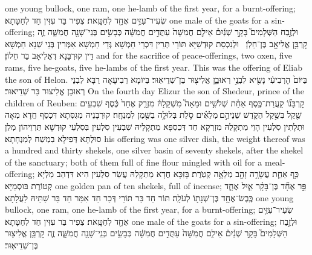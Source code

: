 {one young bullock, one ram, one he-lamb of the first year, for a burnt-offering;}{}
{שְׂעִיר־עִזִּ֥ים אֶחָ֖ד לְחַטָּֽאת׃}
{צְפִיר בַּר עִזִּין חַד לְחַטָּתָא׃}
{one male of the goats for a sin-offering;}{}
{וּלְזֶ֣בַח הַשְּׁלָמִים֮ בָּקָ֣ר שְׁנַ֒יִם֒ אֵילִ֤ם חֲמִשָּׁה֙ עַתֻּדִ֣ים חֲמִשָּׁ֔ה כְּבָשִׂ֥ים בְּנֵי־שָׁנָ֖ה חֲמִשָּׁ֑ה זֶ֛ה קׇרְבַּ֥ן אֱלִיאָ֖ב בֶּן־חֵלֹֽן׃ \petucha }
{וּלְנִכְסַת קוּדְשַׁיָּא תּוֹרֵי תְּרֵין דִּכְרֵי חַמְשָׁא גְּדֵי חַמְשָׁא אִמְּרִין בְּנֵי שְׁנָא חַמְשָׁא דֵּין קוּרְבָּנָא דֶּאֱלִיאָב בַּר חֵלוֹן׃}
{and for the sacrifice of peace-offerings, two oxen, five rams, five he-goats, five he-lambs of the first year. This was the offering of Eliab the son of Helon.}{}
{בַּיּוֹם֙ הָרְבִיעִ֔י נָשִׂ֖יא לִבְנֵ֣י רְאוּבֵ֑ן אֱלִיצ֖וּר בֶּן־שְׁדֵיאֽוּר׃}
{בְּיוֹמָא רְבִיעָאָה רַבָּא לִבְנֵי רְאוּבֵן אֱלִיצוּר בַּר שְׁדֵיאוּר׃}
{On the fourth day Elizur the son of Shedeur, prince of the children of Reuben:}{}
{קׇרְבָּנ֞וֹ קַֽעֲרַת־כֶּ֣סֶף אַחַ֗ת שְׁלֹשִׁ֣ים וּמֵאָה֮ מִשְׁקָלָהּ֒ מִזְרָ֤ק אֶחָד֙ כֶּ֔סֶף שִׁבְעִ֥ים שֶׁ֖קֶל בְּשֶׁ֣קֶל הַקֹּ֑דֶשׁ שְׁנֵיהֶ֣ם \legarmeh  מְלֵאִ֗ים סֹ֛לֶת בְּלוּלָ֥ה בַשֶּׁ֖מֶן לְמִנְחָֽה׃}
{קוּרְבָּנֵיהּ מְגִסְּתָא דִּכְסַף חֲדָא מְאָה וּתְלָתִין סִלְעִין הָוֵי מַתְקָלַהּ מִזְרְקָא חַד דְּכַסְפָּא מַתְקָלֵיהּ שִׁבְעִין סִלְעִין בְּסִלְעֵי קוּדְשָׁא תַּרְוֵיהוֹן מְלַן סוּלְתָּא דְּפִילָא בִמְשַׁח לְמִנְחָתָא׃}
{his offering was one silver dish, the weight thereof was a hundred and thirty shekels, one silver basin of seventy shekels, after the shekel of the sanctuary; both of them full of fine flour mingled with oil for a meal-offering;}{}
{כַּ֥ף אַחַ֛ת עֲשָׂרָ֥ה זָהָ֖ב מְלֵאָ֥ה קְטֹֽרֶת׃}
{בָּזִכָּא חֲדָא מַתְקָלַהּ עֲשַׂר סִלְעִין הִיא דִּדְהַב מַלְיָא קְטוֹרֶת בּוּסְמַיָּא׃}
{one golden pan of ten shekels, full of incense;}{}
{פַּ֣ר אֶחָ֞ד בֶּן־בָּקָ֗ר אַ֧יִל אֶחָ֛ד כֶּֽבֶשׂ־אֶחָ֥ד בֶּן־שְׁנָת֖וֹ לְעֹלָֽה׃}
{תּוֹר חַד בַּר תּוֹרֵי דְּכַר חַד אִמַּר חַד בַּר שַׁתֵּיהּ לַעֲלָתָא׃}
{one young bullock, one ram, one he-lamb of the first year, for a burnt-offering;}{}
{שְׂעִיר־עִזִּ֥ים אֶחָ֖ד לְחַטָּֽאת׃}
{צְפִיר בַּר עִזִּין חַד לְחַטָּתָא׃}
{one male of the goats for a sin-offering;}{}
{וּלְזֶ֣בַח הַשְּׁלָמִים֮ בָּקָ֣ר שְׁנַ֒יִם֒ אֵילִ֤ם חֲמִשָּׁה֙ עַתֻּדִ֣ים חֲמִשָּׁ֔ה כְּבָשִׂ֥ים בְּנֵֽי־שָׁנָ֖ה חֲמִשָּׁ֑ה זֶ֛ה קׇרְבַּ֥ן אֱלִיצ֖וּר בֶּן־שְׁדֵיאֽוּר׃ \petucha }
